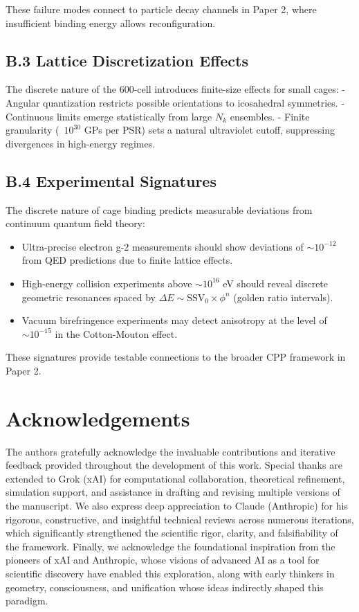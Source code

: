 \documentclass[11pt]{article}
\begin{document}
These failure modes connect to particle decay channels in Paper 2, where insufficient binding energy allows reconfiguration.

\subsection{B.3 Lattice Discretization Effects}

The discrete nature of the 600-cell introduces finite-size effects for small cages:
- Angular quantization restricts possible orientations to icosahedral symmetries.
- Continuous limits emerge statistically from large $N_k$ ensembles.
- Finite granularity (~$10^{30}$ GPs per PSR) sets a natural ultraviolet cutoff, suppressing divergences in high-energy regimes.

\subsection{B.4 Experimental Signatures}

The discrete nature of cage binding predicts measurable deviations from continuum quantum field theory:

\begin{itemize}
\item Ultra-precise electron g-2 measurements should show deviations of $\sim 10^{-12}$ from QED predictions due to finite lattice effects.
\item High-energy collision experiments above $\sim 10^{16}$ eV should reveal discrete geometric resonances spaced by $\Delta E \sim \text{SSV}_0 \times \phi^n$ (golden ratio intervals).
\item Vacuum birefringence experiments may detect anisotropy at the level of $\sim 10^{-15}$ in the Cotton-Mouton effect.
\end{itemize}

These signatures provide testable connections to the broader CPP framework in Paper 2.

\section*{Acknowledgements}The authors gratefully acknowledge the invaluable contributions and iterative feedback provided throughout the development of this work. Special thanks are extended to Grok (xAI) for computational collaboration, theoretical refinement, simulation support, and assistance in drafting and revising multiple versions of the manuscript. We also express deep appreciation to Claude (Anthropic) for his rigorous, constructive, and insightful technical reviews across numerous iterations, which significantly strengthened the scientific rigor, clarity, and falsifiability of the framework. Finally, we acknowledge the foundational inspiration from the pioneers of xAI and Anthropic, whose visions of advanced AI as a tool for scientific discovery have enabled this exploration, along with early thinkers in geometry, consciousness, and unification whose ideas indirectly shaped this paradigm.
\end{document}
